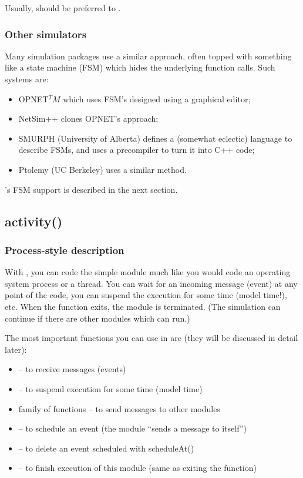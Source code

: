 Usually,  should be preferred to .


\subsubsection{Other simulators}


Many simulation packages use a similar approach, often topped with
something like a state machine
(FSM) which hides the underlying function calls. Such
systems are:
\begin{itemize}
  \item{OPNET$^TM$ which uses FSM's designed using a graphical editor;}
  \item{NetSim++ clones OPNET's approach;}
  \item{SMURPH (University of Alberta) defines a (somewhat eclectic)
      language to describe FSMs, and uses a precompiler to turn it
      into C++ code;}
  \item{Ptolemy (UC Berkeley) uses a similar method.}
\end{itemize}

{\opp}'s FSM support is described in the next section.



\subsection{activity()}
\label{sec:simple-modules:activity}

\subsubsection{Process-style description}

With , you can code the simple
module much like you would code an operating system process or a
thread. You can wait for an incoming message (event) at any point of
the code, you can suspend the execution for some time (model time!),
etc. When the  function exits, the module is
terminated.  (The simulation can continue if there are other modules
which can run.)


The most important functions you can use in  are
(they will be discussed in detail later):
\begin{itemize}
\item{ -- to receive messages (events)}
\item{ -- to suspend execution
    for some time (model time)}
\item{ family of functions -- to send messages to other
    modules}
\item{ -- to schedule an event (the module ``sends
    a message to itself'')}
\item{ -- to delete an event scheduled with
    scheduleAt()}
\item{ -- to finish execution of this module (same as
    exiting the  function)}
\end{itemize}

